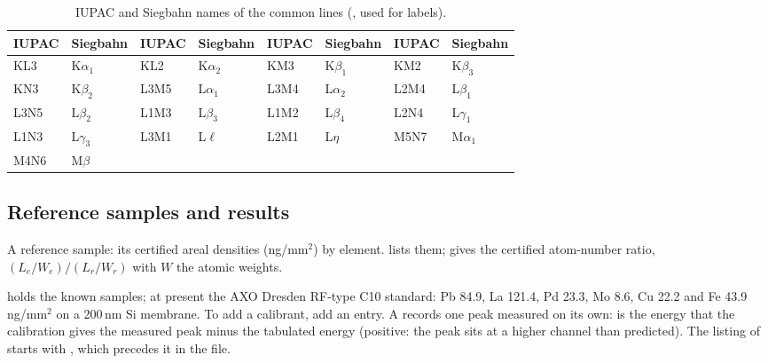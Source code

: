 \begin{table}[h]
\centering\small
\caption{IUPAC and Siegbahn names of the common lines (, used for labels).}
\label{tab:siegbahn}
\begin{tabular}{@{}llllllll@{}}
\toprule
IUPAC & Siegbahn & IUPAC & Siegbahn & IUPAC & Siegbahn & IUPAC & Siegbahn\\
\midrule
KL3 & K$\alpha_1$ & KL2 & K$\alpha_2$ & KM3 & K$\beta_1$ & KM2 & K$\beta_3$\\
KN3 & K$\beta_2$ & L3M5 & L$\alpha_1$ & L3M4 & L$\alpha_2$ & L2M4 & L$\beta_1$\\
L3N5 & L$\beta_2$ & L1M3 & L$\beta_3$ & L1M2 & L$\beta_4$ & L2N4 & L$\gamma_1$\\
L1N3 & L$\gamma_3$ & L3M1 & L$\ell$ & L2M1 & L$\eta$ & M5N7 & M$\alpha_1$\\
M4N6 & M$\beta$ & & & & & &\\
\bottomrule
\end{tabular}
\end{table}


\subsection{Reference samples and results}

A reference sample: its certified areal densities (ng/mm$^2$) by element.  lists
them;  gives the certified atom-number ratio,
$(L_e/W_e)/(L_r/W_r)$ with $W$ the atomic weights.

 holds the known samples; at present the AXO Dresden RF-type C10 standard: Pb
84.9, La 121.4, Pd 23.3, Mo 8.6, Cu 22.2 and Fe 43.9\,ng/mm$^2$ on a 200\,nm Si membrane. To add
a calibrant, add an entry. A  records one peak measured on its own:
 is the energy that the calibration gives the measured peak minus the tabulated
energy (positive: the peak sits at a higher channel than predicted). The listing of
 starts with , which precedes it in the file.

